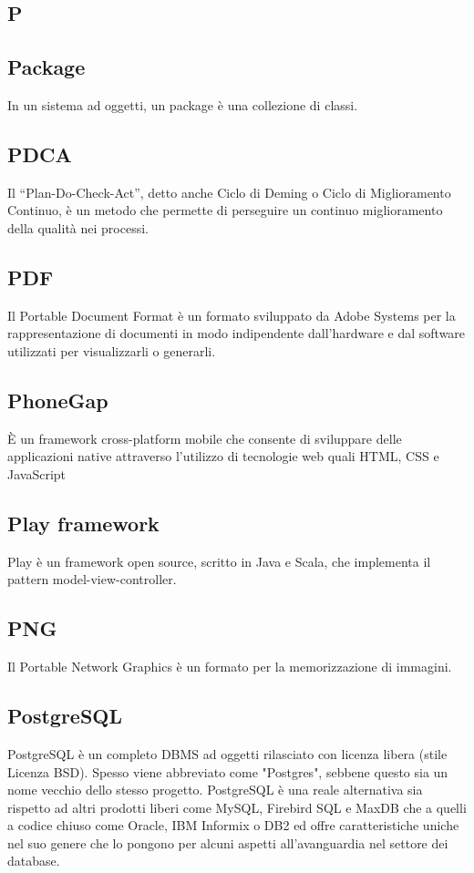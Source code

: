 \newpage

\begin{center}
\Huge\section{\uppercase{P}}
\end{center}

\subsection{Package}
In un sistema ad oggetti, un package è una collezione di classi.

\subsection{PDCA}
Il “Plan-Do-Check-Act”, detto anche Ciclo di Deming o Ciclo di Miglioramento Continuo,
è un metodo che permette di perseguire un continuo miglioramento della qualità nei processi.

\subsection{PDF}
Il Portable Document Format è un formato sviluppato da Adobe Systems per la rappresentazione di documenti in modo indipendente dall'hardware e dal software utilizzati per
visualizzarli o generarli.

\subsection{PhoneGap}
È un framework cross-platform mobile che consente di sviluppare delle applicazioni native attraverso l'utilizzo di tecnologie web quali HTML, CSS e JavaScript

\subsection{Play framework}
Play è un framework open source, scritto in Java e Scala, che implementa il pattern model-view-controller.

\subsection{PNG}
Il Portable Network Graphics è un formato per la memorizzazione di immagini.

\subsection{PostgreSQL}
PostgreSQL è un completo DBMS ad oggetti rilasciato con licenza libera (stile Licenza BSD). Spesso viene abbreviato come "Postgres", sebbene questo sia un nome vecchio dello stesso progetto. PostgreSQL è una reale alternativa sia rispetto ad altri prodotti liberi come MySQL, Firebird SQL e MaxDB che a quelli a codice chiuso come Oracle, IBM Informix o DB2 ed offre caratteristiche uniche nel suo genere che lo pongono per alcuni aspetti all'avanguardia nel settore dei database.


